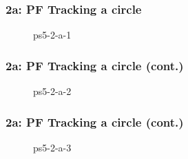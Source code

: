\documentclass[../report.tex]{subfiles}
\begin{document}
    
    \begin{frame}
        \frametitle{2a: PF Tracking a circle}
        \begin{figure}[!htb]
            \centering
            \caption{ps5-2-a-1}
        \end{figure}
    \end{frame}

    \begin{frame}
        \frametitle{2a: PF Tracking a circle (cont.)}
        \begin{figure}[!htb]
            \centering
            \caption{ps5-2-a-2}
        \end{figure}
    \end{frame}

    \begin{frame}
        \frametitle{2a: PF Tracking a circle (cont.)}
        \begin{figure}[!htb]
            \centering
            \caption{ps5-2-a-3}
        \end{figure}
    \end{frame}
\end{document}
